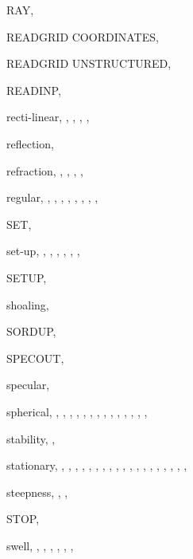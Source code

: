 \documentclass[12pt]{book}
\begin{document}
\begin{theindex}
  \indexspace

  \item RAY, 
  \item READGRID COORDINATES, 
  \item READGRID UNSTRUCTURED, 
  \item READINP, 
  \item recti-linear, , , ,
		, 
  \item reflection, 
  \item refraction, , , ,
		, 
  \item regular, , , ,
		, , ,
		, , 

  \indexspace

  \item SET, 
  \item set-up, , , ,
		, , ,
  \item SETUP, 
  \item shoaling, 
  \item SORDUP, 
  \item SPECOUT, 
  \item specular, 
  \item spherical, , , ,
		, , ,
		, , ,
		, , ,
		, , 
  \item stability, , 
  \item stationary, , , ,
		, , ,
		, ,
		, , ,
		, , ,
		, , ,
		, , 
  \item steepness, , , 
  \item STOP, 
  \item swell, , , ,
		, , ,


\end{theindex}
\end{document}
